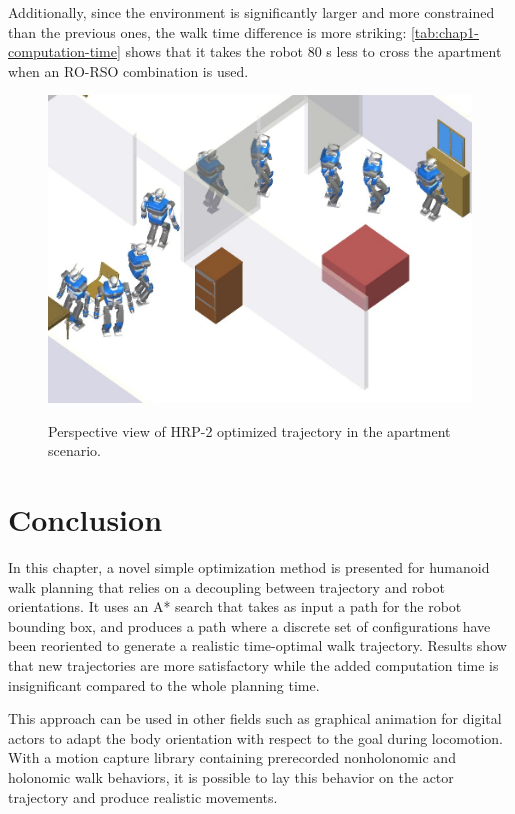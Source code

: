 Additionally, since the environment is significantly larger and more
constrained than the previous ones, the walk time difference is more
striking: \autoref{tab:chap1-computation-time} shows that it takes the robot
80 s less to cross the apartment when an RO-RSO combination is used.

\begin{figure}
  \centering
      {\includegraphics[width = \linewidth]
        {src/chap1-path-optimization/apartment-hash-optim-perspective-hrp2.png}}
      \caption{Perspective view of HRP-2 optimized trajectory in the
        apartment scenario.}
      \label{fig:chap1-apartment-hash-optim-perspective-hrp2}
\end{figure}

\section{Conclusion}
In this chapter, a novel simple optimization method is
presented for humanoid walk planning that relies on a decoupling
between trajectory and robot orientations. It uses an A* search that
takes as input a path for the robot bounding box, and produces a path
where a discrete set of configurations have been reoriented to generate
a realistic time-optimal walk trajectory. Results show that new
trajectories are more satisfactory while the added computation time is
insignificant compared to the whole planning time.

This approach can be used in other fields such as graphical animation
for digital actors to adapt the body orientation with respect to the
goal during locomotion. With a motion capture library containing
prerecorded nonholonomic and holonomic walk behaviors, it is possible
to lay this behavior on the actor trajectory and produce realistic
movements.

